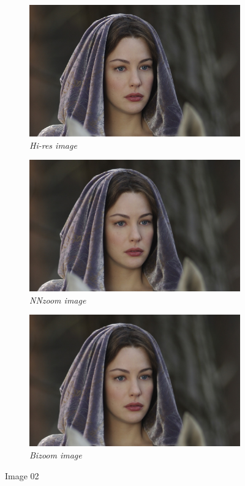 \documentclass[11pt, a4paper]{article}
\begin{document}
\begin{figure}[H]
	\centering
	\begin{subfigure}[b]{0.3\textwidth}
		\centering
		\includegraphics[width=\textwidth]{./a01images/im02.png}
		\caption{{\small \textit{Hi-res image}}}
	\end{subfigure}
	\hfill
	\begin{subfigure}[b]{0.3\textwidth}
		\centering
		\includegraphics[width=\textwidth]{./Outputs/nnzoomfloor02.jpg}
		\caption{{\small \textit{NNzoom image}}}
	\end{subfigure}
	\hfill
	\begin{subfigure}[b]{0.3\textwidth}
		\centering
		\includegraphics[width=\textwidth]{./Outputs/bizoom02.jpg}
		\caption{{\small \textit{Bizoom image}}}
	\end{subfigure}
	\caption{Image 02}
\end{figure}
\end{document}
